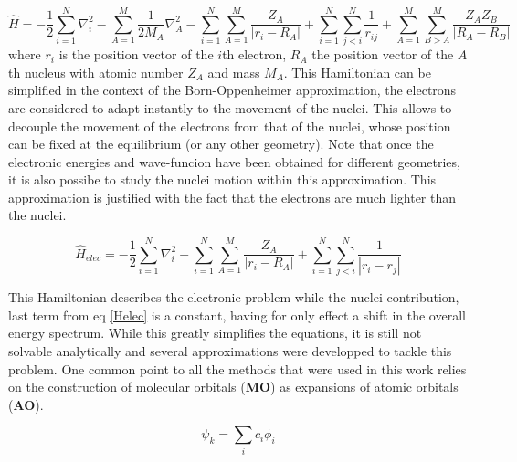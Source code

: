 \documentclass[10pt]{report}
\numberwithin{equation}{section}
\begin{document}
\begin{equation}\label{Helec}
    \hat{H}=-\frac{1}{2}\sum_{i=1}^{N}\nabla_i^2-\sum_{A=1}^{M}\frac{1}{2M_A}\nabla_A^2%
    -\sum_{i=1}^{N}\sum_{A=1}^{M}\frac{Z_A}{|r_i-R_A|}+\sum_{i=1}^{N}\sum_{j<i}^{N}\frac{1}{r_{ij}}%
    +\sum_{A=1}^{M}\sum_{B>A}^{M}\frac{Z_A Z_B}{|R_A-R_B|}
\end{equation}
where $r_i$ is the position vector of the $i$th electron, $R_A$ the position vector of the $A$th nucleus with atomic number $Z_A$ and mass $M_A$.
This Hamiltonian can be simplified in the context of the Born-Oppenheimer approximation, the electrons are considered to adapt instantly to the movement of the nuclei.
This allows to decouple the movement of the electrons from that of the nuclei, whose position can be fixed at the equilibrium (or any other geometry).
Note that once the electronic energies and wave-funcion have been obtained for different geometries, it is also possibe to study the nuclei motion within this approximation.
This approximation is justified with the fact that the electrons are much lighter than the nuclei. 

\begin{equation}\label{HBO}
    \hat{H}_{elec}=-\frac{1}{2}\sum_{i=1}^{N}\nabla_i^2%
    -\sum_{i=1}^{N}\sum_{A=1}^{M}\frac{Z_A}{|r_i-R_A|}+\sum_{i=1}^{N}\sum_{j<i}^{N}\frac{1}{|r_i-r_j|}%
\end{equation}

This Hamiltonian describes the electronic problem while the nuclei contribution, last term from eq \ref{Helec} is a constant, having for only effect a shift in the overall energy spectrum. 
While this greatly simplifies the equations, it is still not solvable analytically and several approximations were developped to tackle this problem. %
One common point to all the methods that were used in this work relies on the construction of molecular orbitals (\textbf{MO}) as expansions of atomic orbitals (\textbf{AO}).

\begin{equation}
    \psi_k=\sum_{i}c_i \phi_i
\end{equation}
\end{document}
